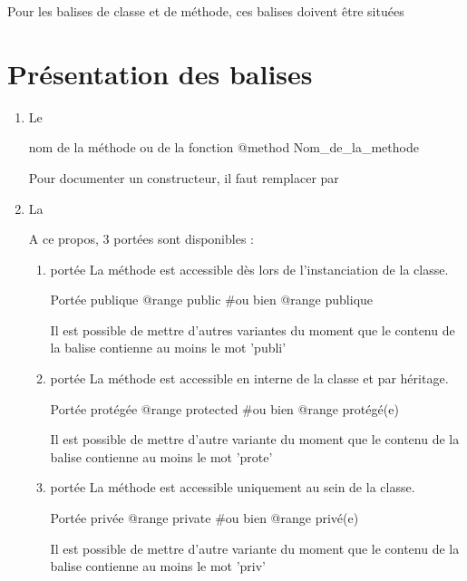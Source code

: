 Pour les balises de classe et de méthode, ces balises doivent être situées 

\section{Présentation des balises}

\begin{enumerate}
    \item Le 
\begin{Bash}{nom de la méthode ou de la fonction}
@method Nom_de_la_methode
\end{Bash}
    
   Pour documenter un constructeur, il faut remplacer  par 
    
    \item La 
        
        A ce propos, 3 portées sont disponibles :
        
        \begin{enumerate}
            \item portée  \newline
            La méthode est accessible dès lors de l'instanciation de la classe.
\begin{Bash}{Portée publique}
@range public
#ou bien
@range publique
\end{Bash}
Il est possible de mettre d'autres variantes du moment que le contenu de la balise contienne au moins le mot 'publi'

            \item portée  \newline
            La méthode est accessible en interne de la classe et par héritage.
            
\begin{Bash}{Portée protégée}
@range protected
#ou bien
@range protégé(e)
\end{Bash}
Il est possible de mettre d'autre variante du moment que le contenu de la balise contienne au moins le mot 'prote'

            \item portée  \newline
            La méthode est accessible uniquement au sein de la classe.
\begin{Bash}{Portée privée}
@range private
#ou bien
@range privé(e)
\end{Bash}
Il est possible de mettre d'autre variante du moment que le contenu de la balise contienne au moins le mot 'priv'


\end{enumerate}
\end{enumerate}
